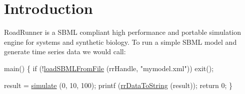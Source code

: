 \hypertarget{index_intro_sec}{}\section{Introduction}\label{index_intro_sec}
Road\-Runner is a S\-B\-M\-L compliant high performance and portable simulation engine for systems and synthetic biology. To run a simple S\-B\-M\-L model and generate time series data we would call\-:


\begin{DoxyCode}
main()
\{
   \textcolor{keywordflow}{if} (!\hyperlink{group__loadsave_ga275b8f8d7350505c383fdc9634713041}{loadSBMLFromFile} (rrHandle, \textcolor{stringliteral}{"mymodel.xml"}))
       exit();

   result = \hyperlink{group__simulation_ga7631952c1a80ac25724bf67f7a7ddf7a}{simulate} (0, 10, 100);
   printf (\hyperlink{group__to_string_gaca8178efe067c3fb79f06f8dae02d210}{rrDataToString} (result));
   \textcolor{keywordflow}{return} 0;
\}
\end{DoxyCode}



